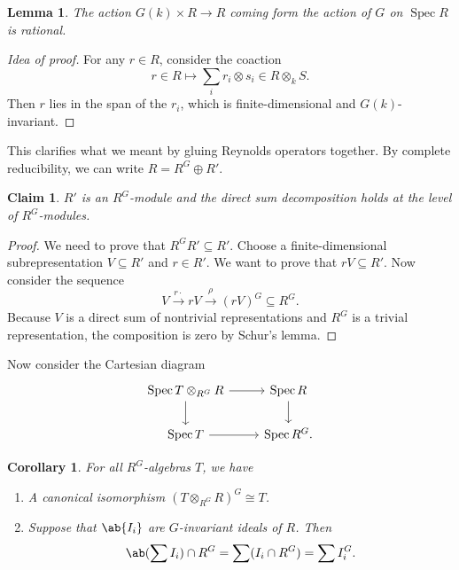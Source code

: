 \documentclass{amsart}
\newtheorem{cor}[thm]{Corollary}
\newtheorem{lem}[thm]{Lemma}
\newtheorem{claim}[thm]{Claim}
\theoremstyle{definition}
\theoremstyle{remark}
\theoremstyle{plain}
\theoremstyle{definition}
\theoremstyle{remark}
\newcommand{\1}{\mathbf{1}}
\newcommand{\2}{\mathbf{2}}
\newcommand{\3}{\mathbf{3}}
\DeclareMathOperator{\Spec}{Spec}
\begin{document}
\begin{lem}
    The action \(G(k) \times R \to R\) coming form the action of \(G\) on \(\Spec R\) is rational.
\end{lem}

\begin{proof}[Idea of proof]
    For any \(r \in R\), consider the coaction
    \[ r \in R \mapsto \sum_i r_i \otimes s_i \in R \otimes_k S. \]
    Then \(r\) lies in the span of the \(r_i\), which is finite-dimensional and \(G(k)\)-invariant.
\end{proof}

This clarifies what we meant by gluing Reynolds operators together. By complete reducibility, we can write \(R = R^G \oplus R'\).

\begin{claim}
    \(R'\) is an \(R^G\)-module and the direct sum decomposition holds at the level of \(R^G\)-modules.
\end{claim}

\begin{proof}
    We need to prove that \(R^G R' \subseteq R'\). Choose a finite-dimensional subrepresentation \(V \subseteq R'\) and \(r \in R'\). We want to prove that \(rV \subseteq R'\). Now consider the sequence
    \[ V \xrightarrow{r \cdot} rV \xrightarrow{\rho} (rV)^G \subseteq R^G. \]
    Because \(V\) is a direct sum of nontrivial representations and \(R^G\) is a trivial representation, the composition is zero by Schur's lemma.
\end{proof}

Now consider the Cartesian diagram
\begin{equation*}
\begin{tikzcd}
    \Spec T\otimes_{R^G} R \ar{r} \ar{d} & \Spec R \ar{d} \\
    \Spec T \ar{r} & \Spec R^G.
\end{tikzcd}
\end{equation*}
\begin{cor}
    For all \(R^G\)-algebras \(T\), we have
    \begin{enumerate}
        \item A canonical isomorphism \((T \otimes_{R^G} R)^G \cong T\).
        \item Suppose that \(\ab\{I_i\}\) are \(G\)-invariant ideals of \(R\). Then 
        \[ \ab(\sum I_i) \cap R^G = \sum (I_i \cap R^G) = \sum I_i^G. \]
    \end{enumerate}
\end{cor}
\end{document}
